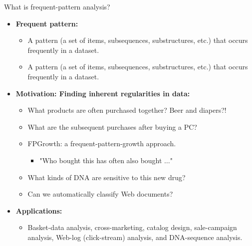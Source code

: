 \documentclass[aspectratio=169,t,xcolor=dvipsnames]{beamer}
\begin{document}
  {
    \begin{frame}{What is frequent-pattern analysis?}
        \begin{itemize}
            \item \textbf{Frequent pattern:}
            \begin{itemize}
              \item A pattern (a set of items, subsequences, substructures, etc.) that occurs frequently in a dataset.
              \item A pattern (a set of items, subsequences, substructures, etc.) that occurs frequently in a dataset.
            \end{itemize}
            \item \textbf{Motivation: Finding inherent regularities in data:}
            \begin{itemize}
              \item What products are often purchased together? Beer and diapers?!
              \item What are the subsequent purchases after buying a PC?
              \item FPGrowth: a frequent-pattern-growth approach.
              \begin{itemize}
                \item "Who bought this has often also bought $\ldots$"
              \end{itemize}
              \item What kinds of DNA are sensitive to this new drug?
              \item Can we automatically classify Web documents?
            \end{itemize}
            \item \textbf{Applications:}
            \begin{itemize}
              \item Basket-data analysis, cross-marketing, catalog design, sale-campaign analysis, Web-log (click-stream) analysis, and DNA-sequence analysis.
            \end{itemize}
        \end{itemize}
    \end{frame}
  }
\end{document}
